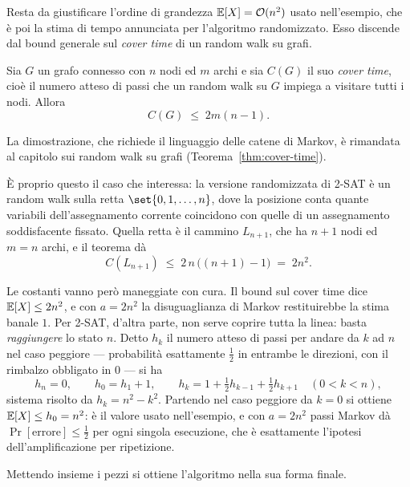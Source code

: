 Resta da giustificare l'ordine di grandezza $\mathbb{E}[X] = \mathcal{O}(n^2)$ usato nell'esempio, che è poi
la stima di tempo annunciata per l'algoritmo randomizzato. Esso discende dal bound generale
sul \emph{cover time} di un random walk su grafi.

\begin{teorema}\label{thm:cover}
  Sia $G$ un grafo connesso con $n$ nodi ed $m$ archi e sia $C(G)$ il suo \emph{cover time},
  cioè il numero atteso di passi che un random walk su $G$ impiega a visitare tutti i nodi.
  Allora
  \[
    C(G) \;\le\; 2m(n-1).
  \]
\end{teorema}

La dimostrazione, che richiede il linguaggio delle catene di Markov, è rimandata al capitolo
sui random walk su grafi (Teorema~\ref{thm:cover-time}).

È proprio questo il caso che interessa: la versione randomizzata di 2-SAT è un random walk
sulla retta $\set{0,1,\dots,n}$, dove la posizione conta quante variabili dell'assegnamento
corrente coincidono con quelle di un assegnamento soddisfacente fissato. Quella retta è il
cammino $L_{n+1}$, che ha $n+1$ nodi ed $m = n$ archi, e il teorema dà
\[
  C(L_{n+1}) \;\le\; 2\,n\,\bigl((n+1)-1\bigr) \;=\; 2n^2 .
\]

\begin{osservazione}
Le costanti vanno però maneggiate con cura. Il bound sul cover time dice $\mathbb{E}[X] \le 2n^2$, e
con $a = 2n^2$ la disuguaglianza di Markov restituirebbe la stima banale $1$. Per 2-SAT,
d'altra parte, non serve coprire tutta la linea: basta \emph{raggiungere} lo stato $n$. Detto
$h_k$ il numero atteso di passi per andare da $k$ ad $n$ nel caso peggiore --- probabilità
esattamente $\tfrac12$ in entrambe le direzioni, con il rimbalzo obbligato in $0$ --- si ha
\[
  h_n = 0,\qquad h_0 = h_1 + 1,\qquad
  h_k = 1 + \tfrac12 h_{k-1} + \tfrac12 h_{k+1}\quad (0<k<n),
\]
sistema risolto da $h_k = n^2 - k^2$. Partendo nel caso peggiore da $k=0$ si ottiene
$\mathbb{E}[X] \le h_0 = n^2$: è il valore usato nell'esempio, e con $a = 2n^2$ passi Markov dà
$\Pr[\text{errore}] \le \tfrac12$ per ogni singola esecuzione, che è esattamente l'ipotesi
dell'amplificazione per ripetizione.
\end{osservazione}

Mettendo insieme i pezzi si ottiene l'algoritmo nella sua forma finale.


